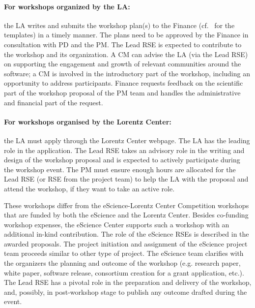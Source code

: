 \paragraph{For workshops organized by the LA:} the LA writes and submits the workshop plan(s) to the Finance (cf.~\cite{proj-portfolio} 
for the templates) in a timely manner. The plans need to be approved by the Finance in consultation with PD and the PM. The
Lead RSE is expected to contribute to the workshop and its organization. A CM can advise the LA (via the Lead RSE) on
supporting the engagement and growth of relevant communities around the software; a CM is involved in the introductory
part of the workshop, including an opportunity to address participants. Finance requests feedback on the scientific part 
of the workshop proposal of the PM team and handles the administrative and financial part of the request. 
%
\paragraph{For workshops organised by the Lorentz Center:} the LA must apply through the Lorentz Center webpage.
%
The LA has the leading role in the application. The Lead RSE takes an advisory role in the writing and design of the
workshop proposal and is expected to actively participate during the workshop event. The PM must ensure enough hours
are allocated for the Lead RSE (or RSE from the project team) to help the LA with the proposal and attend the workshop,
if they want to take an active role.

These workshops differ from the eScience-Lorentz Center Competition workshops that are funded by both the eScience and
the Lorentz Center. Besides co-funding workshop expenses, the eScience Center supports such a workshop with an
additional in-kind contribution. The role of the eScience RSEs is described in the awarded proposals. The project
initiation and assignment of the eScience project team proceeds similar to other type of project. The eScience team
clarifies with the organizers the planning and outcome of the workshop (e.g. research paper, white paper, software
release, consortium creation for a grant application, etc.). The Lead RSE has a pivotal role in the preparation and
delivery of the workshop, and, possibly, in post-workshop stage to publish any outcome drafted during the event. 

